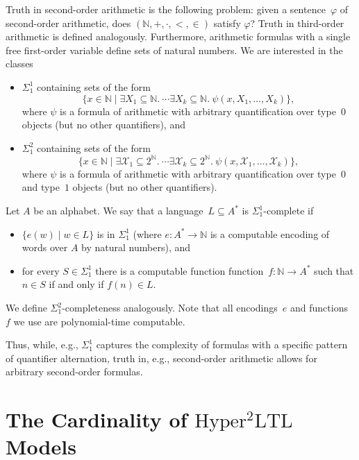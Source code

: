 \documentclass[dvipsnames,10pt,a4paper]{amsart}
\theoremstyle{definition}
\theoremstyle{remark}
\newcommand{\nats}{\mathbb{N}}
\renewcommand{\phi}{\varphi}
\newcommand{\pow}[1]{2^{#1}}
\newcommand{\set}[1]{\{#1\}}
\newcommand{\sohyltl}{\mathrm{Hyper^2LTL}\xspace}
\newcommand{\natsstruct}{(\nats, +, \cdot, <, \in)}
\begin{document}
Truth in second-order arithmetic is the following problem: given a sentence~$\phi$ of second-order arithmetic, does $\natsstruct $ satisfy $\phi$?
Truth in third-order arithmetic is defined analogously.
Furthermore, arithmetic formulas with a single free first-order variable define sets of natural numbers. We are interested in the classes
\begin{itemize}
    \item $\Sigma_1^1$ containing sets of the form
    \[\set{x \in\nats \mid \exists X_1 \subseteq \nats.\ \cdots \exists X_k\subseteq \nats.\ \psi(x, X_1, \ldots,X_k )},\] where $\psi$ is a formula of arithmetic with arbitrary quantification over type~$0$ objects (but no other quantifiers), and
    \item $\Sigma_1^2$ containing sets of the form
    \[
    \set{x \in\nats \mid \exists \mathcal{X}_1\subseteq \pow{\nats}.\ \cdots \exists \mathcal{X}_k\subseteq \pow{\nats}. \ \psi(x, \mathcal{X}_1, \ldots,\mathcal{X}_k)},
    \]
    where $\psi$ is a formula of arithmetic with arbitrary quantification over type~$0$ and type~$1$ objects (but no other quantifiers).
\end{itemize}

Let $A$ be an alphabet.
We say that a language~$L \subseteq A^*$ is $\Sigma_1^1$-complete if 
\begin{itemize}
    \item $\set{e(w) \mid w \in L}$ is in $\Sigma_1^1$ (where $e\colon A^* \rightarrow \nats$ is a computable encoding of words over $A$ by natural numbers), and

    \item for every $S \in \Sigma_1^1$ there is a computable function function~$f\colon \nats \rightarrow A^*$ such that $n \in S$ if and only if $f(n) \in L$.

\end{itemize}
We define $\Sigma_1^2$-completeness analogously.
Note that all encodings~$e$ and functions~$f$ we use are polynomial-time computable.

Thus, while, e.g., $\Sigma_1^1$ captures the complexity of formulas with a specific pattern of quantifier alternation, truth in, e.g., second-order arithmetic allows for arbitrary second-order formulas.

\section{\texorpdfstring{The Cardinality of $\sohyltl$ Models}{The Cardinality of Second-order HyperLTL Models}} 
\label{sec_models}
\end{document}
